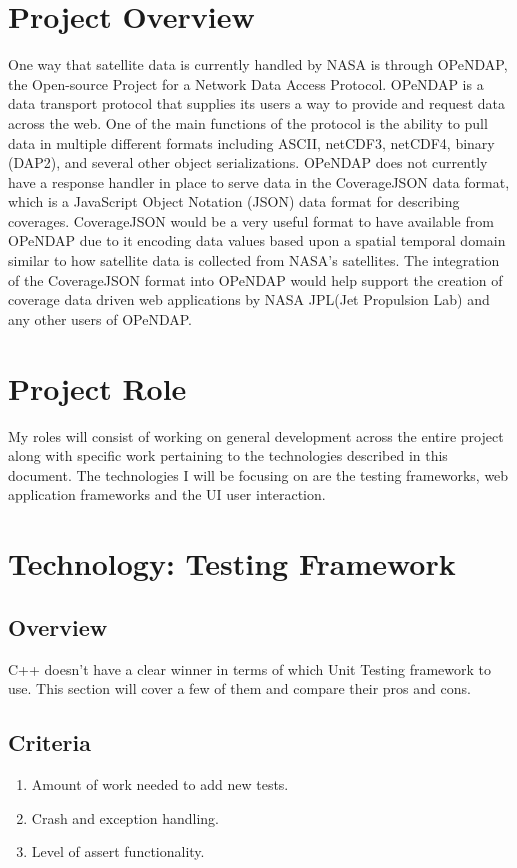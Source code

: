 \documentclass[onecolumn, draftclsnofoot,10pt, compsoc]{IEEEtran}
\begin{document}
\section{Project Overview}
One way that satellite data is currently handled by NASA is through OPeNDAP, the Open-source Project for a Network Data Access Protocol. 
OPeNDAP is a data transport protocol that supplies its users a way to provide and request data across the web. 
One of the main functions of the protocol is the ability to pull data in multiple different formats including ASCII, netCDF3, netCDF4, binary (DAP2), and several other object serializations. 
OPeNDAP does not currently have a response handler in place to serve data in the CoverageJSON data format, which is a JavaScript Object Notation (JSON) data format for describing coverages. 
CoverageJSON would be a very useful format to have available from OPeNDAP due to it encoding data values based upon a spatial temporal domain similar to how satellite data is collected from NASA's satellites. 
The integration of the CoverageJSON format into OPeNDAP would help support the creation of coverage data driven web applications by NASA JPL(Jet Propulsion Lab) and any other users of OPeNDAP.

\section{Project Role}
My roles will consist of working on general development across the entire project along with specific work pertaining to the technologies described in this document.
The technologies I will be focusing on are the testing frameworks, web application frameworks and the UI user interaction.

\section{Technology: Testing Framework}

\subsection{Overview}
C++ doesn't have a clear winner in terms of which Unit Testing framework to use. This section will cover a few of them and compare their pros and cons.
\subsection{Criteria}
\begin{enumerate}
\item Amount of work needed to add new tests.
\item Crash and exception handling.
\item Level of assert functionality.
\end{enumerate}
\end{document}
